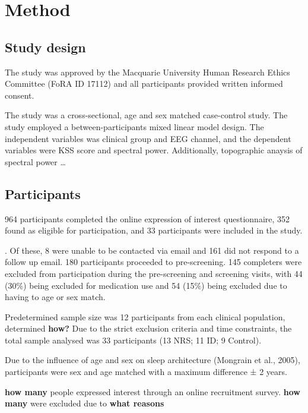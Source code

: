 \documentclass[
]{article}
\begin{document}
\newpage

\section{Method}\label{sec:method}

\subsection{Study design}\label{study-design}

The study was approved by the Macquarie University Human Research Ethics
Committee (FoRA ID 17112) and all participants provided written informed
consent.

The study was a cross-sectional, age and sex matched case-control study.
The study employed a between-participants mixed linear model design. The
independent variables was clinical group and EEG channel, and the
dependent variables were KSS score and spectral power. Additionally,
topographic anaysis of spectral power \ldots{}

\subsection{Participants}\label{participants}

964 participants completed the online expression of interest
questionnaire, 352 found as eligible for participation, and 33
participants were included in the study.

. Of these, 8 were unable to be contacted via email and 161 did not
respond to a follow up email. 180 participants proceeded to
pre-screening. 145 completers were excluded from participation during
the pre-screening and screening visits, with 44 (30\%) being excluded
for medication use and 54 (15\%) being excluded due to having to age or
sex match.

Predetermined sample size was 12 participants from each clinical
population, determined \textbf{how?} Due to the strict exclusion
criteria and time constraints, the total sample analysed was 33
participants (13 NRS; 11 ID; 9 Control).

Due to the influence of age and sex on sleep architecture (Mongrain et
al., 2005), participants were sex and age matched with a maximum
difference ± 2 years.

\textbf{how many} people expressed interest through an online
recruitment survey. \textbf{how many} were excluded due to \textbf{what
reasons}
\end{document}
